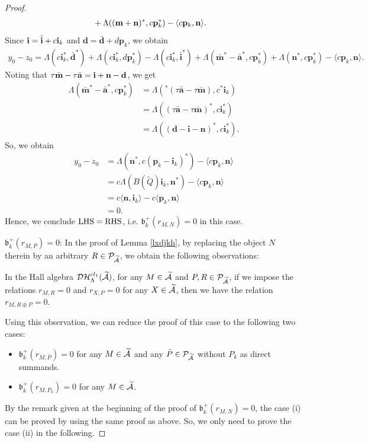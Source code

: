 \documentclass[reqno,12pt]{amsart}
\numberwithin{equation}{section}
\def\lr#1{\langle #1\rangle} \def\fin{\hfill$\square$}  \def\lra{\longrightarrow} \def\mod{\mbox{\rm \textbf{mod}}\,}\def\Mod{\mbox{\rm mod}\,}\def\top{\mbox{\rm top}\,}\def\soc{\mbox{\rm soc}\,}
\theoremstyle{plain} %
\theoremstyle{definition} %
\begin{document}
\begin{proof}
\begin{align*}
	&+\Lambda(({\bf m}+{\bf n})^\ast,c{\bf p}_k^\ast)-\lr{c{\bf p}_k,{\bf n}}.
\end{align*}
Since $\mathbf{i}=\bar{\mathbf{i}}+c{\bf i}_k$ and $\mathbf{d}=\bar{\mathbf{d}}+d\mathbf{p}_k$, we obtain
\begin{align*}
	y_0-z_0=\Lambda(c\mathbf{i}_k^\ast,\bar{\mathbf{d}}^\ast)+\Lambda(c\mathbf{i}_k^\ast,d\mathbf{p}_k^\ast)-\Lambda(c\mathbf{i}_k^\ast,\bar{\mathbf{i}}^\ast)+\Lambda(\bar{\mathbf{m}}^\ast-\bar{\mathbf{a}}^\ast,c\mathbf{p}_k^\ast)+\Lambda(\mathbf{n}^\ast,c\mathbf{p}_k^\ast)-\lr{c\mathbf{p}_k,\mathbf{n}}.
\end{align*}
Noting that $\tau \bar{\bf m}-\tau\bar{\bf a}=\mathbf{i}+\mathbf{n}-\mathbf{d}$, we get
\begin{align*}
	\Lambda(\bar{\mathbf{m}}^\ast-\bar{\mathbf{a}}^\ast,c\mathbf{p}_k^\ast)&=\Lambda( ^\ast(\tau\bar{\mathbf{a}}-\tau \bar{\mathbf{m}}),c ^\ast\mathbf{i}_k)\\
	&=\Lambda( (\tau\bar{\mathbf{a}}-\tau \bar{\mathbf{m}})^\ast,c \mathbf{i}_k^\ast)\\
	&=\Lambda((\mathbf{d}-\mathbf{i}-\mathbf{n})^\ast, c\mathbf{i}_k^\ast).
\end{align*}
So, we obtain
\begin{align*}
	y_0-z_0&=\Lambda(\mathbf{n}^\ast,c(\mathbf{p}_k-\mathbf{i}_k)^\ast)-\lr{c\mathbf{p}_k,\mathbf{n}}\\
	&=c\Lambda(B(\widetilde{Q})\mathbf{i}_k,\mathbf{n}^\ast)-\lr{c\mathbf{p}_k,\mathbf{n}}\\
	&=c\lr{\mathbf{n},\mathbf{i}_k}-c\lr{\mathbf{p}_k,\mathbf{n}}\\
	&=0.
\end{align*}
Hence, we conclude ${\rm LHS}={\rm RHS}$, i.e. $\mathfrak{b}_k^+(r_{M,N})=0$ in this case.

 $\mathfrak{b}_k^+(r_{M,P})=0$:
In the proof of Lemma \ref{lxdjkh}, by replacing the object $N$ therein by an arbitrary $R\in\mathcal{P}_{\widetilde{\mathcal{A}}}$, we obtain the following observations:

In the Hall algebra $\mathcal {D}\mathcal {H}_\Lambda^{{cl}_1}(\widetilde{\mathcal{A}})$, for any $M\in\widetilde{\mathcal{A}}$ and $P,R\in\mathcal{P}_{\widetilde{\mathcal{A}}}$, if we impose the relations $r_{M,R}=0$ and $r_{X,P}=0$ for any $X\in \widetilde{\mathcal{A}}$, then we have the relation $r_{M,R\oplus P}=0$.

Using this observation, we can reduce the proof of this case to the following two cases:
\begin{itemize}
	\item[(i)] $\mathfrak{b}_k^+(r_{M,\bar{P}})=0$ for any $M\in\widetilde{\mathcal{A}}$ and any $\bar{P}\in \mathcal{P}_{\widetilde{\mathcal{A}}}$ without $P_k$ as direct summands.
	\item[(ii)] $\mathfrak{b}_k^+(r_{M,P_k})=0$ for any $M\in\widetilde{\mathcal{A}}$.
\end{itemize}
By the remark given at the beginning of the proof of $\mathfrak{b}_k^+(r_{M,N})=0$, the case (i) can be proved by using the same proof as above. So, we only need to prove the case (ii) in the following.




\end{proof}
\end{document}
